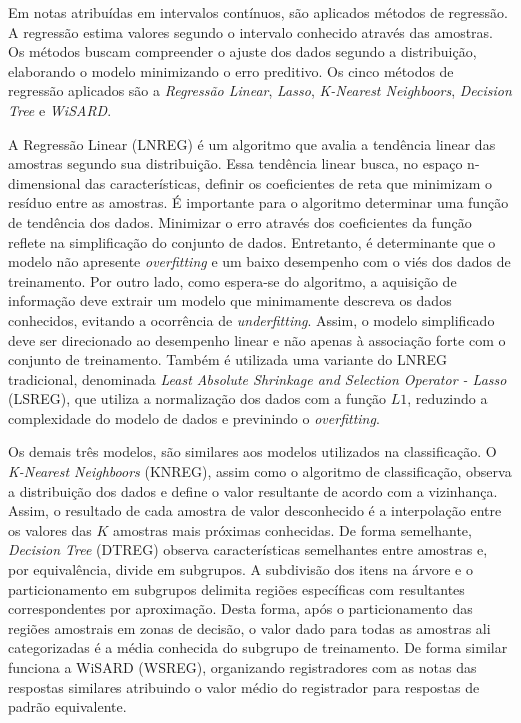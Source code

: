 Em notas atribuídas em intervalos contínuos, são aplicados métodos de regressão. A regressão estima valores segundo o intervalo conhecido através das amostras. Os métodos buscam compreender o ajuste dos dados segundo a distribuição, elaborando o modelo minimizando o erro preditivo. Os cinco métodos de regressão aplicados são a \textit{Regressão Linear}, \textit{Lasso}, \textit{K-Nearest Neighboors}, \textit{Decision Tree} e \textit{WiSARD}.

A Regressão Linear (LNREG) é um algoritmo que avalia a tendência linear das amostras segundo sua distribuição. Essa tendência linear busca, no espaço n-dimensional das características, definir os coeficientes de reta que minimizam o resíduo entre as amostras. É importante para o algoritmo determinar uma função de tendência dos dados. Minimizar o erro através dos coeficientes da função reflete na simplificação do conjunto de dados. Entretanto, é determinante que o modelo não apresente \textit{overfitting} e um baixo desempenho com o viés dos dados de treinamento. Por outro lado, como espera-se do algoritmo, a aquisição de informação deve extrair um modelo que minimamente descreva os dados conhecidos, evitando a ocorrência de \textit{underfitting}. Assim, o modelo simplificado deve ser direcionado ao desempenho linear e não apenas à associação forte com o conjunto de treinamento. Também é utilizada uma variante do LNREG tradicional, denominada \textit{Least Absolute Shrinkage and Selection Operator - Lasso} (LSREG), que utiliza a normalização dos dados com a função $ L1 $, reduzindo a complexidade do modelo de dados e previnindo o \textit{overfitting}.

Os demais três modelos, são similares aos modelos utilizados na classificação. O \textit{K-Nearest Neighboors} (KNREG), assim como o algoritmo de classificação, observa a distribuição dos dados e define o valor resultante de acordo com a vizinhança. Assim, o resultado de cada amostra de valor desconhecido é a interpolação entre os valores das $ K $ amostras mais próximas conhecidas. De forma semelhante, \textit{Decision Tree} (DTREG) observa características semelhantes entre amostras e, por equivalência, divide em subgrupos. A subdivisão dos itens na árvore e o particionamento em subgrupos delimita regiões específicas com resultantes correspondentes por aproximação. Desta forma, após o particionamento das regiões amostrais em zonas de decisão, o valor dado para todas as amostras ali categorizadas é a média conhecida do subgrupo de treinamento. De forma similar funciona a WiSARD (WSREG), organizando registradores com as notas das respostas similares atribuindo o valor médio do registrador para respostas de padrão equivalente.

